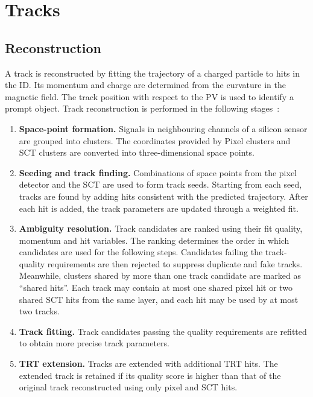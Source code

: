 \section{Tracks}
\label{sec:ch6_tracks}

\subsection{Reconstruction}

A track is reconstructed by fitting the trajectory of a charged particle to hits in the ID.
Its momentum and charge are determined from the curvature in the magnetic field. The track position with respect to the PV is used to identify a prompt object.
Track reconstruction is performed in the following stages~\cite{ATLAS2017DenseTracking}:
\begin{enumerate}
    \item \textbf{Space-point formation.} Signals in neighbouring channels of a silicon sensor are grouped into clusters. The coordinates provided by Pixel clusters and SCT clusters are converted into three-dimensional space points.
    \item \textbf{Seeding and track finding.} Combinations of space points from the pixel detector and the SCT are used to form track seeds. Starting from each seed, tracks are found by adding hits consistent with the predicted trajectory. After each hit is added, the track parameters are updated through a weighted fit.
    \item \textbf{Ambiguity resolution.} Track candidates are ranked using their fit quality, momentum and hit variables. The ranking determines the order in which candidates are used for the following steps. Candidates failing the track-quality requirements are then rejected to suppress duplicate and fake tracks. Meanwhile, clusters shared by more than one track candidate are marked as ``shared hits''. Each track may contain at most one shared pixel hit or two shared SCT hits from the same layer, and each hit may be used by at most two tracks.
    \item \textbf{Track fitting.} Track candidates passing the quality requirements are refitted to obtain more precise track parameters.
    \item \textbf{TRT extension.} Tracks are extended with additional TRT hits. The extended track is retained if its quality score is higher than that of the original track reconstructed using only pixel and SCT hits.
\end{enumerate}

